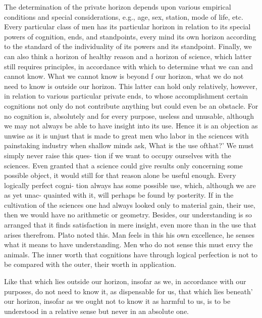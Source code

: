     The determination of the private horizon depends upon various
    empirical conditions and special considerations,
    e.g., age, sex, station, mode of life, etc.
    Every particular class of men has its particular horizon in relation
    to its special powers of cognition, ends, and standpoints, every mind its
    own horizon according to the standard of the individuality of its powers
    and its standpoint. Finally, we can also think a horizon of healthy reason
    and a horizon of science, which latter still requires principles, in accordance
    with which to determine what we can and cannot know.
    What we cannot know is beyond f our horizon, what we do not need to
    know is outside our horizon. This latter can hold only relatively, however,
    in relation to various particular private ends, to whose accomplishment
    certain cognitions not only do not contribute anything but could even be
    an obstacle. For no cognition is, absolutely and for every purpose, useless
    and unusable, although we may not always be able to have insight into its
    use. Hence it is an objection as unwise as it is unjust that is made to great
    men who labor in the sciences with painstaking industry when shallow
    minds ask, What is the use ofthat?' We must simply never raise this ques-
    tion if we want to occupy ourselves with the sciences. Even granted that a
    science could give results only concerning some possible object, it would
    still for that reason alone be useful enough. Every logically perfect cogni-
    tion always has some possible use, which, although we are as yet unac-
    quainted with it, will perhaps be found by posterity. If in the cultivation of
    the sciences one had always looked only to material gain, their use, then
    we would have no arithmetic or geometry. Besides, our understanding is
    so arranged that it finds satisfaction in mere insight, even more than in the
    use that arises therefrom. Plato noted this. Man feels in this his own
    excellence, he senses what it means to have understanding. Men who do
    not sense this must envy the animals. The inner worth that cognitions have
    through logical perfection is not to be compared with the outer, their worth
    in application.

    Like that which lies outside our horizon, insofar as we, in accordance
    with our purposes, do not need to know it, as dispensable for us, that which
    lies beneath' our horizon, insofar as we ought not to know it as harmful to
    us, is to be understood in a relative sense but never in an absolute one.

